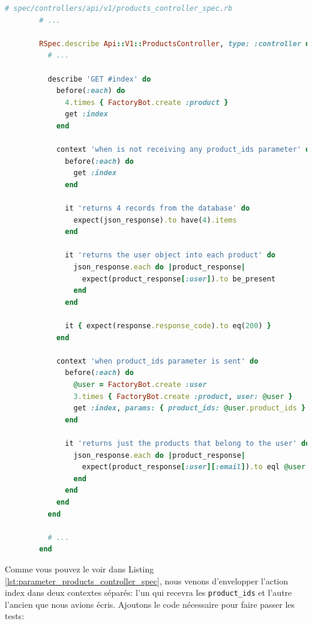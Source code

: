 \documentclass[]{report}
\begin{document}
      \begin{scriptsize}
        \begin{lstlisting}[language=ruby, caption={Tests du paramètre d'identifiants des produits pour l'affichage de l'index des produits}, label={lst:parameter_products_controller_spec}]
        # spec/controllers/api/v1/products_controller_spec.rb
        # ...

        RSpec.describe Api::V1::ProductsController, type: :controller do
          # ...

          describe 'GET #index' do
            before(:each) do
              4.times { FactoryBot.create :product }
              get :index
            end

            context 'when is not receiving any product_ids parameter' do
              before(:each) do
                get :index
              end

              it 'returns 4 records from the database' do
                expect(json_response).to have(4).items
              end

              it 'returns the user object into each product' do
                json_response.each do |product_response|
                  expect(product_response[:user]).to be_present
                end
              end

              it { expect(response.response_code).to eq(200) }
            end

            context 'when product_ids parameter is sent' do
              before(:each) do
                @user = FactoryBot.create :user
                3.times { FactoryBot.create :product, user: @user }
                get :index, params: { product_ids: @user.product_ids }
              end

              it 'returns just the products that belong to the user' do
                json_response.each do |product_response|
                  expect(product_response[:user][:email]).to eql @user.email
                end
              end
            end
          end

          # ...
        end
        \end{lstlisting}
      \end{scriptsize}

      Comme vous pouvez le voir dans Listing \ref{lst:parameter_products_controller_spec}, nous venons d'envelopper l'action index dans deux contextes séparés: l'un qui recevra les \verb|product_ids| et l'autre l'ancien que nous avions écris. Ajoutons le code nécessaire pour faire passer les tests:
\end{document}
